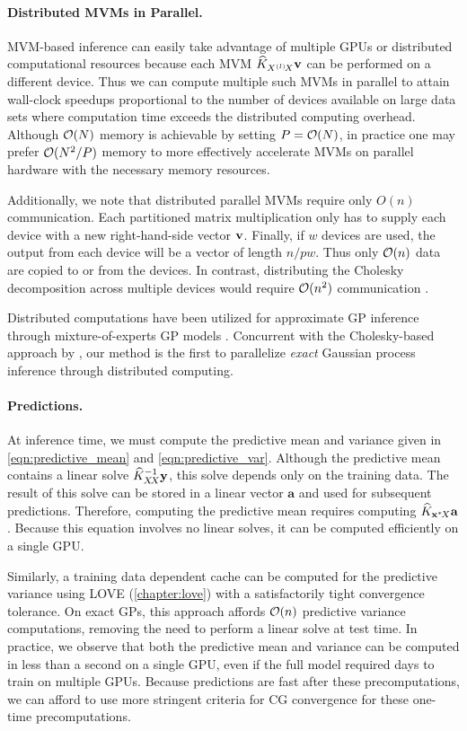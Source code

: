 \paragraph{Distributed MVMs in Parallel.}
MVM-based inference can easily take advantage of multiple GPUs or distributed
computational resources because each MVM $\widehat {K}_{X^{(l)}\!X}\mathbf{v}$ can be performed
on a different device. Thus we can compute multiple such MVMs in parallel to
attain wall-clock speedups proportional to the number of devices
available on large data sets where computation time exceeds the distributed
computing overhead. Although $\bigo{N}$ memory is achievable by setting $P = \bigo{N}$, in
practice one may prefer $\bigo{N^2/P}$ memory to more effectively accelerate
MVMs on parallel hardware with the necessary memory resources.

Additionally, we note that distributed parallel MVMs
require only $O(n)$ communication.
Each partitioned matrix multiplication only has
to supply each device with a new right-hand-side vector $\mathbf{v}$. Finally, if $w$ devices are used, the output from each
device will be a vector of length $n / pw$. Thus only $\bigo{n}$ data are copied to or from the devices.
In contrast, distributing the Cholesky decomposition across multiple devices
would require $\bigo{n^2}$ communication \citep{nguyen2019exact}.

Distributed computations have been utilized for approximate GP inference through
mixture-of-experts GP models \citep{deisenroth2015distributed}. Concurrent with the Cholesky-based approach by \citet{nguyen2019exact},
our method is the first to parallelize \emph{exact} Gaussian process inference through distributed computing.

\paragraph{Predictions.} At inference time, we must compute the predictive mean and variance
given in \cref{eqn:predictive_mean} and \cref{eqn:predictive_var}. Although the predictive mean contains a linear solve $\widehat {K}_{X \! X}^{-1}
\mathbf{y}$, this solve depends only on the training data. The result of this solve can
be stored in a linear vector $\mathbf{a}$ and used for subsequent
predictions. Therefore, computing the predictive mean requires computing
$\widehat {K}_{\mathbf{x}^{*} \! X} \mathbf{a}$. Because this equation involves no linear solves, it can be computed efficiently on a single GPU.

Similarly, a training data dependent cache can be computed for the predictive variance using LOVE (\cref{chapter:love}) with a satisfactorily tight convergence tolerance.
On exact GPs, this approach affords $\bigo{n}$ predictive variance computations, removing the need to perform a linear solve at test time.
In practice, we observe that both the predictive mean and variance can be computed in less than a second on a single GPU, even if the full model required days to train on multiple GPUs.
Because predictions are fast after these precomputations, we can afford to use
more stringent criteria for CG convergence for these one-time precomputations.

